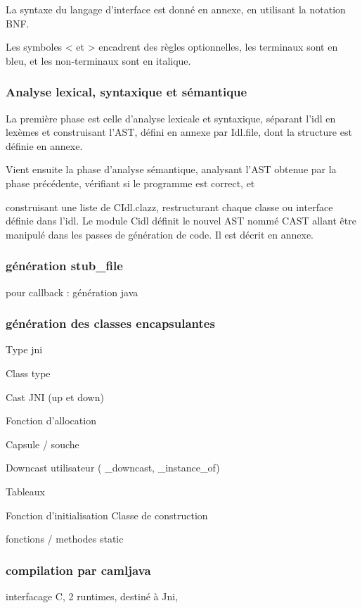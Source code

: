 \documentclass[a4paper, 11pt, notitlepage]{article}
\begin{document}
La syntaxe du langage d'interface est donné en annexe, en utilisant la
notation BNF.

Les symboles < et > encadrent des règles optionnelles,
les terminaux sont en bleu, et les non-terminaux sont en italique.


\subsubsection{Analyse lexical, syntaxique et sémantique}
La première phase est celle d'analyse lexicale et syntaxique,
séparant l'idl en lexèmes et construisant l'AST, défini en annexe par Idl.file,
dont la structure est définie en annexe.

Vient ensuite la phase d'analyse sémantique, analysant l'AST obtenue par la
phase précédente, vérifiant si le programme est correct, et

construisant une liste de CIdl.clazz, restructurant chaque classe ou interface définie dans l'idl. 
Le module Cidl définit le nouvel AST nommé CAST allant être manipulé dans les passes de
génération de code. Il est décrit en annexe.

\subsubsection{génération stub\_file}
pour callback : génération java

\subsubsection{génération des classes encapsulantes}

Type jni

Class type

Cast JNI (up et down)

Fonction d'allocation

Capsule / souche

Downcast utilisateur (
\_downcast,
\_instance\_of)

Tableaux

Fonction d'initialisation
Classe de construction

fonctions / methodes static

\subsubsection{compilation par camljava}
interfacage C, 2 runtimes, destiné à Jni, 
\end{document}
